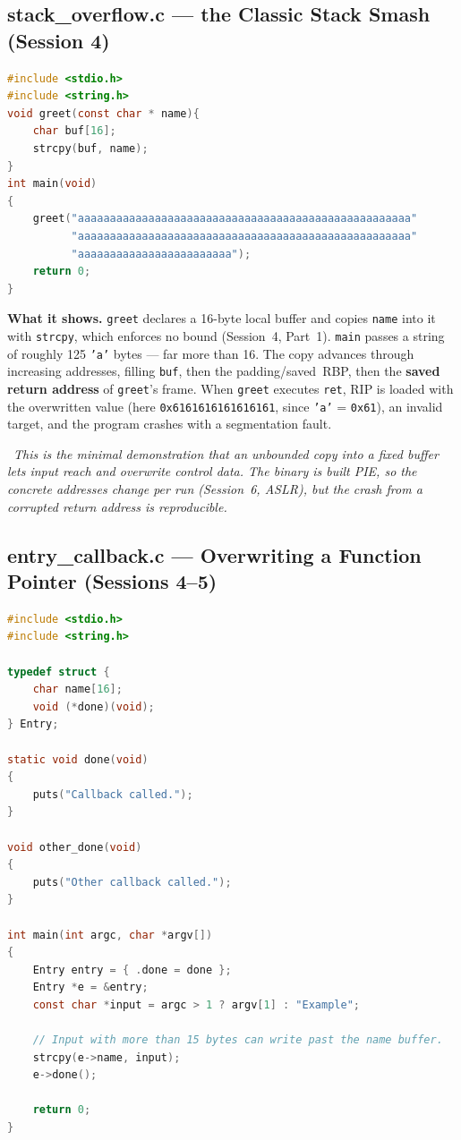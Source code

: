 \documentclass[hidelinks]{article}
\newcommand{\callout}[1]{\par\smallskip\noindent{\color{capri}$\blacktriangleright$}\ \textit{#1}\par\smallskip}
\begin{document}
\subsection{stack\_overflow.c --- the Classic Stack Smash (Session 4)}

\begin{lstlisting}[language=C]
#include <stdio.h>
#include <string.h>
void greet(const char * name){
    char buf[16];
    strcpy(buf, name);
}
int main(void)
{
    greet("aaaaaaaaaaaaaaaaaaaaaaaaaaaaaaaaaaaaaaaaaaaaaaaaaaaa"
          "aaaaaaaaaaaaaaaaaaaaaaaaaaaaaaaaaaaaaaaaaaaaaaaaaaaa"
          "aaaaaaaaaaaaaaaaaaaaaaaa");
    return 0;
}
\end{lstlisting}

\textbf{What it shows.} \texttt{greet} declares a 16-byte local buffer and copies \texttt{name} into it with \texttt{strcpy}, which enforces no bound (Session~4, Part~1). \texttt{main} passes a string of roughly 125 \texttt{'a'} bytes --- far more than 16. The copy advances through increasing addresses, filling \texttt{buf}, then the padding/saved~RBP, then the \textbf{saved return address} of \texttt{greet}'s frame. When \texttt{greet} executes \texttt{ret}, RIP is loaded with the overwritten value (here \texttt{0x6161616161616161}, since \texttt{'a'} = \texttt{0x61}), an invalid target, and the program crashes with a segmentation fault.

\callout{This is the minimal demonstration that an unbounded copy into a fixed buffer lets input reach and overwrite control data. The binary is built PIE, so the concrete addresses change per run (Session~6, ASLR), but the \emph{crash from a corrupted return address} is reproducible.}

\subsection{entry\_callback.c --- Overwriting a Function Pointer (Sessions 4--5)}

\begin{lstlisting}[language=C]
#include <stdio.h>
#include <string.h>

typedef struct {
    char name[16];
    void (*done)(void);
} Entry;

static void done(void)
{
    puts("Callback called.");
}

void other_done(void)
{
    puts("Other callback called.");
}

int main(int argc, char *argv[])
{
    Entry entry = { .done = done };
    Entry *e = &entry;
    const char *input = argc > 1 ? argv[1] : "Example";

    // Input with more than 15 bytes can write past the name buffer.
    strcpy(e->name, input);
    e->done();

    return 0;
}
\end{lstlisting}
\end{document}
